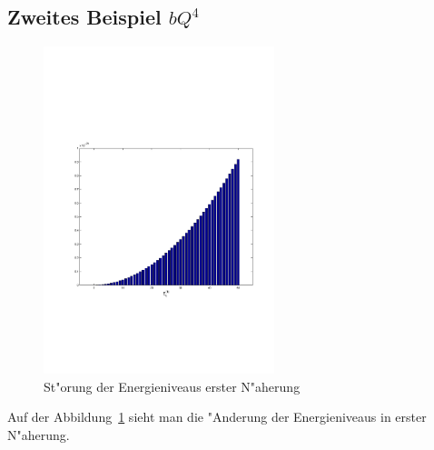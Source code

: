 \begin{refsection}
\subsection{Zweites Beispiel $bQ^4$}

\begin{figure}[h]	%
\centering
\includegraphics[width=0.6\textwidth]{anharmonisch/images/x4/EK1.pdf}
\caption{St"orung der Energieniveaus erster N"aherung
\label{skript:x4_EK1}}
\end{figure}

Auf der Abbildung~\ref{skript:x4_EK1} sieht man die "Anderung der Energieniveaus in erster N"aherung. 


\end{refsection}
